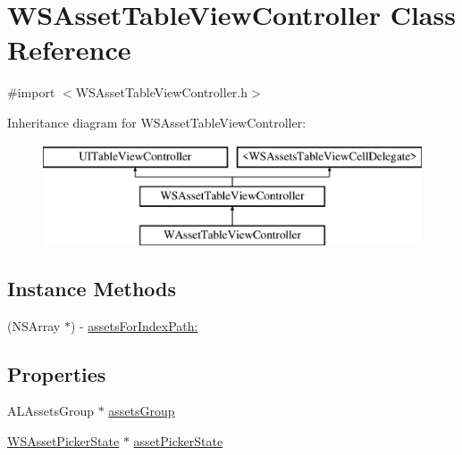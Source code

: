 \hypertarget{interface_w_s_asset_table_view_controller}{\section{W\-S\-Asset\-Table\-View\-Controller Class Reference}
\label{interface_w_s_asset_table_view_controller}
}


{\ttfamily \#import $<$W\-S\-Asset\-Table\-View\-Controller.\-h$>$}

Inheritance diagram for W\-S\-Asset\-Table\-View\-Controller\-:\begin{figure}[H]
\begin{center}
\leavevmode
\includegraphics[height=3.000000cm]{interface_w_s_asset_table_view_controller}
\end{center}
\end{figure}
\subsection*{Instance Methods}
\begin{DoxyCompactItemize}
\item 
(N\-S\-Array $\ast$) -\/ \hyperlink{interface_w_s_asset_table_view_controller_a3509850877f8da2d68e109ff4f54bae3}{assets\-For\-Index\-Path\-:}
\end{DoxyCompactItemize}
\subsection*{Properties}
\begin{DoxyCompactItemize}
\item 
A\-L\-Assets\-Group $\ast$ \hyperlink{interface_w_s_asset_table_view_controller_acb78c2af2dfaf5832c2cec07acdd5898}{assets\-Group}
\item 
\hyperlink{interface_w_s_asset_picker_state}{W\-S\-Asset\-Picker\-State} $\ast$ \hyperlink{interface_w_s_asset_table_view_controller_a179d242aa11248852cff94abfe43a23b}{asset\-Picker\-State}
\end{DoxyCompactItemize}



